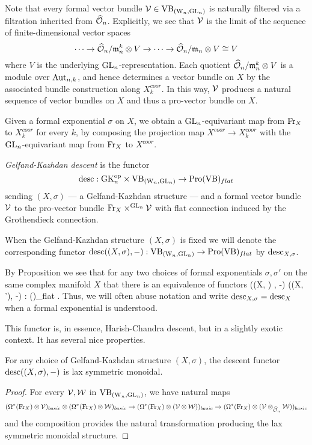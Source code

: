 Note that every formal vector bundle $\mathcal{V} \in {\rm VB}_{({{\rm W}_n}, {\rm GL}_n)}$ is naturally filtered via a filtration inherited from $\widehat{\mathcal O}_n$. 
Explicitly, we see that $\mathcal{V}$ is the limit of the sequence of finite-dimensional vector spaces
\[
\cdots \to \widehat{\mathcal O}_n/{\mathfrak m}_n^k \otimes V \to \cdots \to \widehat{\mathcal O}_n/{\mathfrak m}_n \otimes V \cong V
\]
where $V$ is the underlying ${\rm GL}_n$-representation.
Each quotient $\widehat{\mathcal O}_n/{\mathfrak m}_n^k \otimes V$ is a module over ${\rm Aut}_{n,k}$, and 
hence determines a vector bundle on $X$ by the associated bundle construction along $X^{coor}_k$.
In this way, $\mathcal{V}$ produces a natural sequence of vector bundles on $X$ and thus a pro-vector bundle on $X$.

Given a formal exponential $\sigma$ on $X$, we obtain a ${\rm GL}_n$-equivariant map from ${\rm Fr}_X$ to $X^{coor}_k$ for every $k$,
by composing the projection map $X^{coor} \to X_k^{coor}$ with the ${\rm GL}_n$-equivariant map from ${\rm Fr}_X$ to $X^{coor}$.

\begin{dfn}
{\em Gelfand-Kazhdan descent} is the functor
\[
{\rm desc} : {\rm GK}_n^{{\rm op}} \times {\rm VB}_{({{\rm W}_n}, {\rm GL}_n)} \to {\rm Pro}({\rm VB})_{flat}
\]
sending $(X,\sigma)$ --- a Gelfand-Kazhdan structure
--- and a formal vector bundle $\mathcal{V}$ 
to the pro-vector bundle ${\rm Fr}_X \times^{{\rm GL}_n} \mathcal{V}$ with flat connection induced by the Grothendieck connection.
\end{dfn}

When the Gelfand-Kazhdan structure $(X, \sigma)$ is fixed we will denote the corresponding functor ${\rm desc}((X, \sigma), -) :  {\rm VB}_{({{\rm W}_n}, {\rm GL}_n)} \to {\rm Pro}({\rm VB})_{flat}$ by ${\rm desc}_{X,\sigma}$. 

By Proposition \label{gauge equiv} we see that for any two choices of formal exponentials $\sigma,\sigma'$ on the same complex manifold $X$ that there is an equivalence of functors
\ben
\desc((X, \sigma) , -) \simeq \desc((X, \sigma'), -) :  \WGLCAT \to \Pro(\VB)_{flat} .
\een
Thus, we will often abuse notation and write ${\rm desc}_{X,\sigma} = {\rm desc}_X$ when a formal exponential is understood. 

This functor is, in essence, Harish-Chandra descent, but in a slightly exotic context.
It has several nice properties.

\begin{lem}\label{prop lax}
For any choice of Gelfand-Kazhdan structure $(X,\sigma)$, the descent functor ${\rm desc}((X,\sigma),-)$ is lax symmetric monoidal.
\end{lem}

\begin{proof}
For every $\mathcal{V},\mathcal{W}$ in ${\rm VB}_{({{\rm W}_n}, {\rm GL}_n)}$, we have natural maps
\[
(\Omega^*({\rm Fr}_X) \otimes \mathcal{V})_{basic} \otimes (\Omega^*({\rm Fr}_X) \otimes \mathcal{W})_{basic} \to (\Omega^*({\rm Fr}_X) \otimes (\mathcal{V} \otimes \mathcal{W}))_{basic} \to (\Omega^*({\rm Fr}_X) \otimes (\mathcal{V} \otimes_{\widehat{\mathcal O}_n} \mathcal{W}))_{basic}
\]
and the composition provides the natural transformation producing the lax symmetric monoidal structure.
\end{proof}

